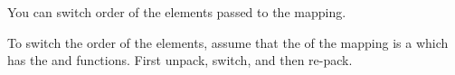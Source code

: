 

\begin{hint}
	You can switch order of the elements passed to the  mapping.

	To switch the order of the elements, assume that the  of the mapping is a  which has the  and  functions.
	First unpack, switch, and then re-pack.
\end{hint}